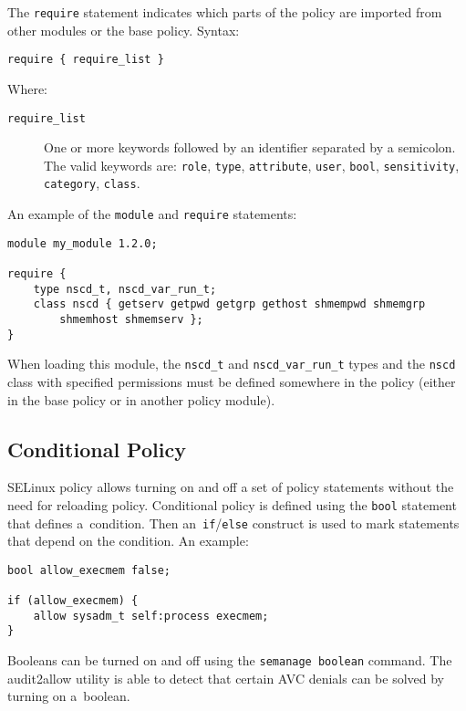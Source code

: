 The \texttt{require} statement indicates which parts of the policy are imported
from other modules or the base policy. Syntax:
\begin{lstlisting}[language=te]
require { require_list }
\end{lstlisting}
Where:
\begin{description}
    \item [\texttt{require\_list}] One or more keywords followed by an
        identifier separated by a semicolon. The valid keywords are:
        \texttt{role}, \texttt{type}, \texttt{attribute}, \texttt{user},
        \texttt{bool}, \texttt{sensitivity}, \texttt{category}, \texttt{class}.
\end{description}

An example of the \texttt{module} and \texttt{require} statements:
\begin{lstlisting}[language=te]
module my_module 1.2.0;

require {
    type nscd_t, nscd_var_run_t;
    class nscd { getserv getpwd getgrp gethost shmempwd shmemgrp
        shmemhost shmemserv };
}
\end{lstlisting}
When loading this module, the \texttt{nscd\_t} and \texttt{nscd\_var\_run\_t}
types and the \texttt{nscd} class with specified permissions must be defined
somewhere in the policy (either in the base policy or in another policy module).

\subsection{Conditional Policy}
\label{booleans}
SELinux policy allows turning on and off a set of policy statements without the
need for reloading policy. Conditional policy is defined using the \texttt{bool}
statement that defines a~condition. Then an~\texttt{if}/\texttt{else} construct
is used to mark statements that depend on the condition. An example:
\begin{lstlisting}[language=te]
bool allow_execmem false;

if (allow_execmem) {
    allow sysadm_t self:process execmem;
}
\end{lstlisting}
Booleans can be turned on and off using the \texttt{semanage boolean} command.
The audit2allow utility is able to detect that certain AVC denials can be solved
by turning on a~boolean.

